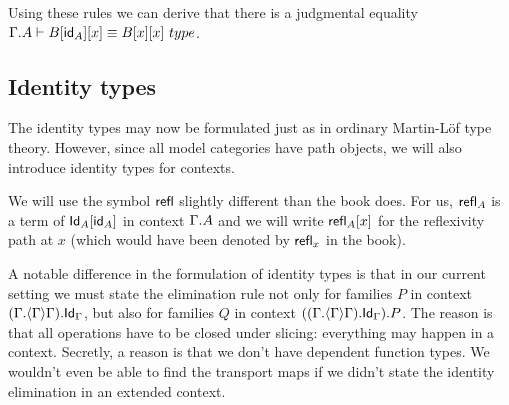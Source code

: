 Using these rules we can derive that there is a judgmental equality $\jtypeeq{\ctxext{\Gamma}{A}}{\subst{x}{{\idfunc[A]}{B}}}
{\subst{x}{{x}{B}}}$.

\subsection{Identity types}
The identity types may now be formulated just as in ordinary Martin\nobreakdash-L\"of
type theory. However, since all model categories have path objects, we will also
introduce identity types for contexts.

We will use the symbol ${\mathsf{refl}}$ slightly different than the book does. For us,
$\mathsf{refl}_{A}$ is a term of $\subst{\idfunc[A]}{\idtypevar{A}}$ in context
$\ctxext{\Gamma}{A}$ and we will write $\subst{x}{\refl{A}}$ for the reflexivity
path at $x$ (which would have been denoted by $\mathsf{refl}_{x}$ in the book).

A notable difference in the formulation of identity types is that in our current
setting we must state the elimination rule not only for families $P$ in context
$\ctxext{{\Gamma}{\ctxwk{\Gamma}{\Gamma}}}{\idtypevar{\Gamma}}$,
but also for families $Q$ in context 
$\ctxext{{{\Gamma}{\ctxwk{\Gamma}{\Gamma}}}{\idtypevar{\Gamma}}}{P}$. The reason
is that all operations have to be closed under slicing: everything may happen
in a context. Secretly, a reason is that we don't have dependent function types.
We wouldn't even be able to find the transport maps if we didn't state the
identity elimination in an extended context.

